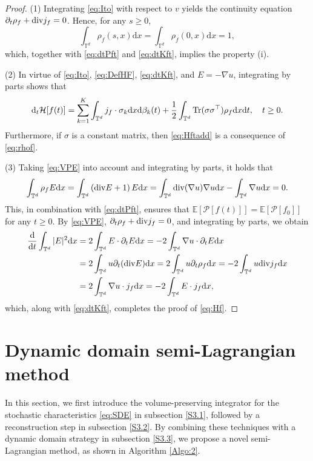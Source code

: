 \documentclass[11pt,reqno]{amsproc}
\newcommand{\ud}{\mathrm d}
\numberwithin{equation}{section}
\newcommand{\E}{\mathbb{E}}\allowdisplaybreaks[4]
\begin{document}
\begin{proof}


(1) Integrating \eqref{eq:Ito} with respect to $v$ yields the continuity equation
$
\partial_t\rho_f+\textup{div}j_f=0$. Hence, for any $s\ge0$,
\begin{equation}\label{eq:rhof}
\int_{\mathbb{T}^d} \rho_f(s,x)\ud x=\int_{\mathbb{T}^d} \rho_f(0,x)\ud x=1,
\end{equation}
which, together with \eqref{eq:dtPft} and \eqref{eq:dtKft}, implies the property (i).


(2) In virtue of \eqref{eq:Ito}, \eqref{eq:DefHF}, \eqref{eq:dtKft}, and $E=-\nabla u$, integrating by parts shows that
\begin{equation*}
\ud_t \mathcal H[f(t)]=\sum_{k=1}^K\int_{\mathbb{T}^d}j_f\cdot\sigma_k\ud x\ud \beta_k(t)+\frac12\int_{\mathbb{T}^d}\textup{Tr}(\sigma\sigma^\top)\rho_f\ud x\ud t,\quad t\ge0.
\end{equation*}
Furthermore, if $\sigma$ is a constant matrix, then \eqref{eq:Hftadd} is a consequence of \eqref{eq:rhof}.

(3)
Taking \eqref{eq:VPE} into account and integrating by parts, it holds that
$$\int_{\mathbb{T}^d} \rho_f E\ud x=\int_{\mathbb{T}^d}\left(\textup{div} E+1\right)E\ud x=\int_{\mathbb{T}^d}\textup{div}(\nabla u) \nabla u\ud x-\int_{\mathbb{T}^d} \nabla u\ud x=0.$$
This, in combination with \eqref{eq:dtPft}, ensures that $\E[\mathcal{P}[f(t)]]=\E[\mathcal{P}[f_0]]$ for any $t\ge0$.
By \eqref{eq:VPE}, $
\partial_t\rho_f+\textup{div}j_f=0$, and integrating by parts, we obtain
\begin{align*}
\frac{\ud}{\ud t}\int_{\mathbb{T}^d}|E|^2\ud x&=2\int_{\mathbb{T}^d}E\cdot\partial_t E\ud x=-2\int_{\mathbb{T}^d}\nabla u\cdot\partial_t E\ud x\\
&=2\int_{\mathbb{T}^d} u\partial_t (\textup{div}E)\ud x=2\int_{\mathbb{T}^d} u\partial_t \rho_f\ud x=-2\int_{\mathbb{T}^d} u\textup{div}j_f\ud x\\
&=2\int_{\mathbb{T}^d} \nabla u\cdot j_f\ud x=-2\int_{\mathbb{T}^d} E\cdot j_f\ud x,
\end{align*}
which, along with \eqref{eq:dtKft}, completes the proof of \eqref{eq:Hf}. 
\end{proof}


\section{Dynamic domain semi-Lagrangian method}\label{S3}
In this section, we first introduce the volume-preserving integrator for the stochastic characteristics \eqref{eq:SDE} in subsection \ref{S3.1}, followed by a reconstruction step in subsection \ref{S3.2}. By combining these techniques with a dynamic domain strategy in subsection \ref{S3.3}, we propose a novel semi-Lagrangian method, as shown in Algorithm \ref{Algo:2}.
\end{document}

